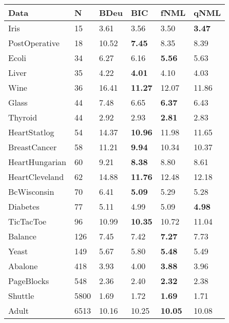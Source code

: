 \begin{tabular}{llllll}
\toprule
           Data &     N &   BDeu &             BIC &            fNML &           qNML \\
\midrule
           Iris &    15 &   3.61 &            3.56 &            3.50 &  \textbf{3.47} \\
  PostOperative &    18 &  10.52 &   \textbf{7.45} &            8.35 &           8.39 \\
          Ecoli &    34 &   6.27 &            6.16 &   \textbf{5.56} &           5.63 \\
          Liver &    35 &   4.22 &   \textbf{4.01} &            4.10 &           4.03 \\
           Wine &    36 &  16.41 &  \textbf{11.27} &           12.07 &          11.86 \\
          Glass &    44 &   7.48 &            6.65 &   \textbf{6.37} &           6.43 \\
        Thyroid &    44 &   2.92 &            2.93 &   \textbf{2.81} &           2.83 \\
   HeartStatlog &    54 &  14.37 &  \textbf{10.96} &           11.98 &          11.65 \\
   BreastCancer &    58 &  11.21 &   \textbf{9.94} &           10.34 &          10.37 \\
 HeartHungarian &    60 &   9.21 &   \textbf{8.38} &            8.80 &           8.61 \\
 HeartCleveland &    62 &  14.88 &  \textbf{11.76} &           12.48 &          12.18 \\
    BcWisconsin &    70 &   6.41 &   \textbf{5.09} &            5.29 &           5.28 \\
       Diabetes &    77 &   5.11 &            4.99 &            5.09 &  \textbf{4.98} \\
      TicTacToe &    96 &  10.99 &  \textbf{10.35} &           10.72 &          11.04 \\
        Balance &   126 &   7.45 &            7.42 &   \textbf{7.27} &           7.73 \\
          Yeast &   149 &   5.67 &            5.80 &   \textbf{5.48} &           5.49 \\
        Abalone &   418 &   3.93 &            4.00 &   \textbf{3.88} &           3.96 \\
     PageBlocks &   548 &   2.36 &            2.40 &   \textbf{2.32} &           2.38 \\
        Shuttle &  5800 &   1.69 &            1.72 &   \textbf{1.69} &           1.71 \\
          Adult &  6513 &  10.16 &           10.25 &  \textbf{10.05} &          10.08 \\
\bottomrule
\end{tabular}
